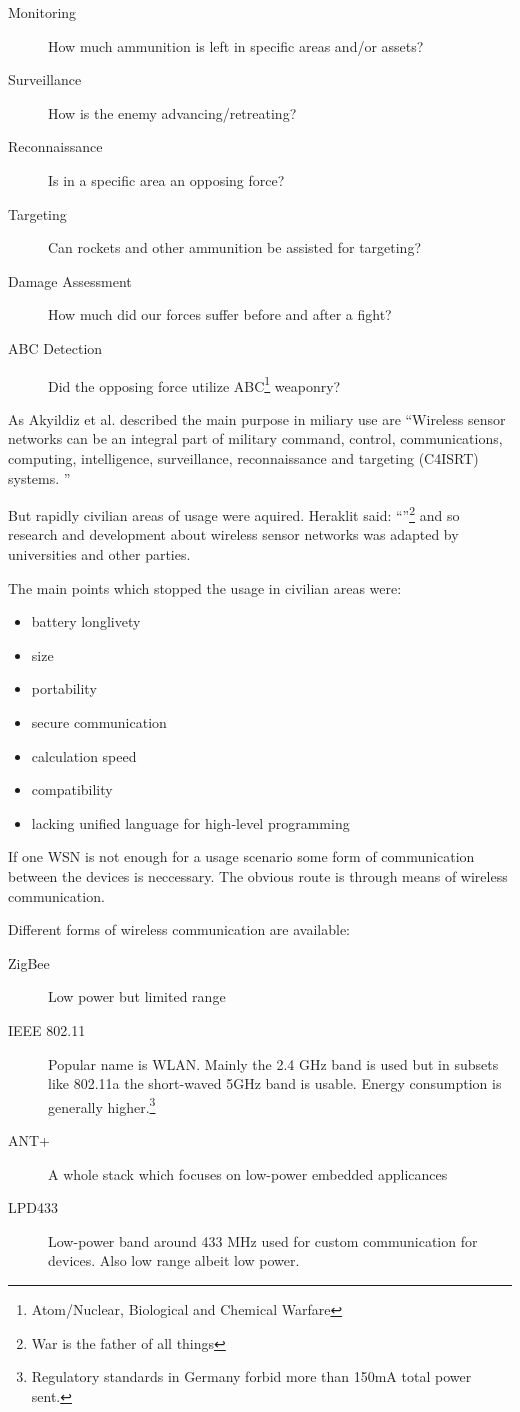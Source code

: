 \begin{description}
    \item[Monitoring] How much ammunition is left in specific areas and/or assets?
    \item[Surveillance] How is the enemy advancing/retreating?
    \item[Reconnaissance] Is in a specific area an opposing force?
    \item[Targeting] Can rockets and other ammunition be assisted for targeting?
    \item[Damage Assessment] How much did our forces suffer before and after a fight?
    \item[ABC Detection] Did the opposing force utilize ABC\footnote{Atom/Nuclear, Biological and Chemical Warfare} weaponry?
\end{description}

As Akyildiz et al. described the main purpose in miliary use are 
``Wireless sensor networks can be an integral part
of military command, control, communications,
computing, intelligence, surveillance, reconnaissance
and targeting (C4ISRT) systems.
''

But rapidly civilian areas of usage were aquired. Heraklit said: ``''\footnote{War is the father of all things} and so 
research and development about wireless sensor networks was adapted by universities and other parties.

The main points which stopped the usage in civilian areas were:

\begin{itemize}
\item battery longlivety
\item size
\item portability
\item secure communication
\item calculation speed
\item compatibility
\item lacking unified language for high-level programming
\end{itemize}

If one \textsc{WSN} is not enough for a usage scenario some form of communication between the devices is neccessary. The obvious
route is through means of wireless communication.

Different forms of wireless communication are available:

\begin{description}
\item[ZigBee] Low power but limited range
\item[IEEE 802.11] Popular name is \textsc{WLAN}. Mainly the 2.4 GHz band is used but in subsets like 802.11a the short-waved 5GHz band is usable.
Energy consumption is generally higher.\footnote{Regulatory standards in Germany forbid more than 150mA total power sent.}
\item[ANT+] A whole stack which focuses on low-power embedded applicances
\item[LPD433] Low-power band around 433 MHz used for custom communication for devices. Also low range albeit low power.
\end{description}

